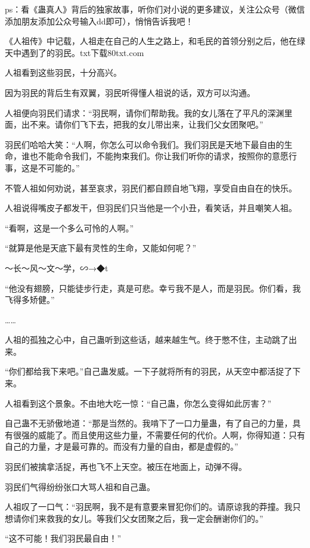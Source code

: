 
\begin{this_body}

ps：看《蛊真人》背后的独家故事，听你们对小说的更多建议，关注公众号（微信添加朋友添加公众号输入dd即可），悄悄告诉我吧！

《人祖传》中记载，人祖走在自己的人生之路上，和毛民的首领分别之后，他在绿天中遇到了的羽民。txt下载80txt.com

人祖看到这些羽民，十分高兴。

因为羽民的背后生有双翼，羽民听得懂人祖说的话，双方可以沟通。

人祖便向羽民们请求：“羽民啊，请你们帮助我。我的女儿落在了平凡的深渊里面，出不来。请你们飞下去，把我的女儿带出来，让我们父女团聚吧。”

羽民们哈哈大笑：“人啊，你怎么可以命令我们。我们羽民是天地下最自由的生命，谁也不能命令我们，不能拘束我们。你让我们听你的请求，按照你的意愿行事，这是不可能的。”

不管人祖如何劝说，甚至哀求，羽民们都自顾自地飞翔，享受自由自在的快乐。

人祖说得嘴皮子都发干，但羽民们只当他是一个小丑，看笑话，并且嘲笑人祖。

“看啊，这是一个多么可怜的人啊。”

“就算是他是天底下最有灵性的生命，又能如何呢？”

～长～风～文～学，∽→◆t

“他没有翅膀，只能徒步行走，真是可悲。幸亏我不是人，而是羽民。你们看，我飞得多矫健。”

……

人祖的孤独之心中，自己蛊听到这些话，越来越生气。终于憋不住，主动跳了出来。

“你们都给我下来吧。”自己蛊发威。一下子就将所有的羽民，从天空中都活捉了下来。

人祖看到这个景象。不由地大吃一惊：“自己蛊，你怎么变得如此厉害？”

自己蛊不无骄傲地道：“那是当然的。我啃下了一口力量蛊，有了自己的力量，具有很强的威能了。而且使用这些力量，不需要任何的代价。人啊，你得知道：只有自己的力量，才是最可靠的。而没有力量的自由，都是虚假的。”

羽民们被擒拿活捉，再也飞不上天空。被压在地面上，动弹不得。

羽民们气得纷纷张口大骂人祖和自己蛊。

人祖叹了一口气：“羽民啊，我不是有意要来冒犯你们的。请原谅我的莽撞。我只想请你们来救我的女儿。等我们父女团聚之后，我一定会酬谢你们的。”

“这不可能！我们羽民最自由！”


\end{this_body}
